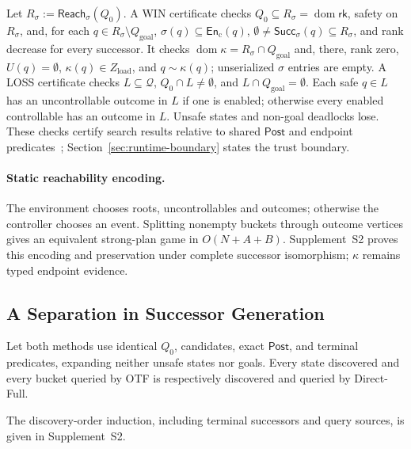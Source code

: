 \documentclass[acmsmall,screen,review,anonymous]{acmart}
\newcommand{\Post}{\mathsf{Post}}
\newcommand{\Goal}{Q_{\mathrm{goal}}}
\newcommand{\rank}{\mathsf{rk}}
\newcommand{\Reach}{\mathsf{Reach}}
\newcommand{\SuccSet}{\mathsf{Succ}}
\newcommand{\En}{\mathsf{En}}
\begin{document}
\begin{corollary}
\label{cor:losing}
\label{cor:independent-certificate}
Let $R_\sigma:=\Reach_\sigma(Q_0)$. A WIN certificate checks $Q_0\subseteq R_\sigma=\operatorname{dom}\rank$, safety on $R_\sigma$, and, for each $q\in R_\sigma\setminus\Goal$, $\sigma(q)\subseteq\En_{\mathrm c}(q)$, $\emptyset\neq\SuccSet_\sigma(q)\subseteq R_\sigma$, and rank decrease for every successor. It checks $\operatorname{dom}\kappa=R_\sigma\cap\Goal$ and, there, rank zero, $U(q)=\emptyset$, $\kappa(q)\in Z_{\mathrm{load}}$, and $q\sim\kappa(q)$; unserialized $\sigma$ entries are empty.
A LOSS certificate checks $L\subseteq\mathcal Q$, $Q_0\cap L\neq\emptyset$, and $L\cap\Goal=\emptyset$. Each safe $q\in L$ has an uncontrollable outcome in $L$ if one is enabled; otherwise every enabled controllable has an outcome in $L$. Unsafe states and non-goal deadlocks lose. These checks certify search results relative to shared $\Post$ and endpoint predicates~\cite{HofmannEtAl2016MuCertificates}; Section~\ref{sec:runtime-boundary} states the trust boundary.
\end{corollary}

\paragraph{Static reachability encoding.}
The environment chooses roots, uncontrollables and outcomes; otherwise the controller chooses an event. Splitting nonempty buckets through outcome vertices gives an equivalent strong-plan game in $O(N+A+B)$. Supplement~S2 proves this encoding and preservation under complete successor isomorphism; $\kappa$ remains typed endpoint evidence.
\subsection{A Separation in Successor Generation}
\begin{lemma}
\label{lem:full-containment}
Let both methods use identical $Q_0$, candidates, exact $\Post$, and terminal predicates, expanding neither unsafe states nor goals. Every state discovered and every bucket queried by OTF is respectively discovered and queried by Direct-Full.
\end{lemma}
\noindent The discovery-order induction, including terminal successors and query sources, is given in Supplement~S2.
\end{document}
